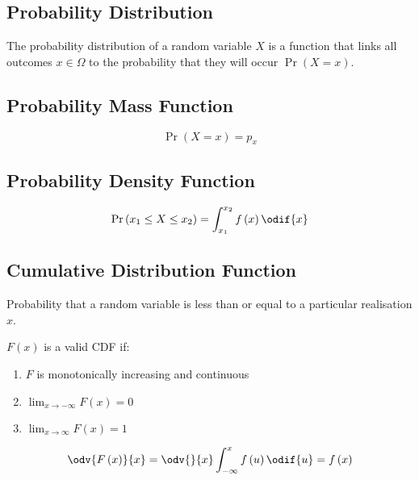 \documentclass{article}
\begin{document}
\begin{multicols}{3}
        \subsection{Probability Distribution}
        The probability distribution of a random variable \(X\) is a function that links all outcomes \(x \in \Omega\)
        to the probability that they will occur \(\Pr{\left( X = x \right)}\).
        \subsection{Probability Mass Function}
        \begin{equation*}
            \Pr{\left( X = x \right)} = p_x
        \end{equation*}
        \subsection{Probability Density Function}
        \begin{equation*}
            \Pr{\left( x_1 \leq X \leq x_2 \right)} = \int_{x_1}^{x_2} f\left( x \right) \odif{x}
        \end{equation*}
        \subsection{Cumulative Distribution Function}
        Probability that a random variable is
        less than or equal to a particular realisation \(x\).

        \(F\left( x \right)\) is a valid CDF if:
        \begin{enumerate}
            \item \(F\) is monotonically increasing and continuous
            \item \(\lim_{x \to -\infty} F\left( x \right) = 0\)
            \item \(\lim_{x \to \infty} F\left( x \right) = 1\)
        \end{enumerate}
        \begin{equation*}
            \odv{F\left( x \right)}{x} = \odv{}{x} \int_{-\infty}^x f\left( u \right) \odif{u} = f\left( x \right)
        \end{equation*}

\end{multicols}
\end{document}
